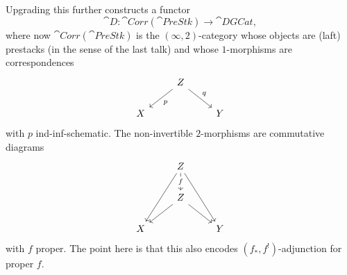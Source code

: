 \documentclass{ck-article}
\newcommand\catDGCat{\cat{DGCat}}
\newcommand\catPreStk{\cat{PreStk}}
\newcommand\catCorrPreStk{\cat{Corr}(\catPreStk)}
\begin{document}
Upgrading this further \cite{GaitsgoryRozenblyum:2017:StudyInDAG:2} constructs a functor
\[
    \cat{D}\colon \catCorrPreStk \to \catDGCat,
\]
where now $\catCorrPreStk$ is the $(\infty, 2)$-category whose objects are (laft) prestacks (in the sense of the last talk) and whose $1$-morphisms are correspondences
\[
    \begin{tikzcd}
        & Z \arrow[dl, "p"] \arrow[dr, "q"] & \\
        X & & Y
    \end{tikzcd}
\]
with $p$ ind-inf-schematic.
The non-invertible $2$-morphisms are commutative diagrams
\[
    \begin{tikzcd}
        & Z \arrow[ddl]  \arrow[ddr] \arrow[d, "f" description] & \\
        & Z \arrow[dl]  \arrow[dr] & \\
        X & & Y
    \end{tikzcd}
\]
with $f$ proper.
The point here is that this also encodes $(f_*, f^!)$-adjunction for proper $f$.

\printbibliography
\end{document}
